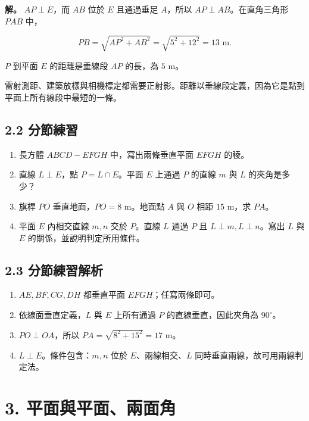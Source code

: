 \documentclass[11pt,a4paper]{article}
\providecommand{\tightlist}{%
  \setlength{\itemsep}{0pt}\setlength{\parskip}{0pt}}
\begin{document}
\textbf{解。} \(AP\perp E\)，而 \(AB\) 位於 \(E\) 且通過垂足 \(A\)，所以 \(AP\perp AB\)。在直角三角形 \(PAB\) 中，

\[
PB=\sqrt{AP^2+AB^2}=\sqrt{5^2+12^2}=13\text{ m}.
\]

\(P\) 到平面 \(E\) 的距離是垂線段 \(AP\) 的長，為 \(5\text{ m}\)。

雷射測距、建築放樣與相機標定都需要正射影。距離以垂線段定義，因為它是點到平面上所有線段中最短的一條。

\subsection{2.2 分節練習}\label{ux5206ux7bc0ux7df4ux7fd2-1}

\begin{enumerate}
\def\labelenumi{\arabic{enumi}.}
\tightlist
\item
  長方體 \(ABCD-EFGH\) 中，寫出兩條垂直平面 \(EFGH\) 的稜。
\item
  直線 \(L\perp E\)，點 \(P=L\cap E\)。平面 \(E\) 上通過 \(P\) 的直線 \(m\) 與 \(L\) 的夾角是多少？
\item
  旗桿 \(PO\) 垂直地面，\(PO=8\text{ m}\)。地面點 \(A\) 與 \(O\) 相距 \(15\text{ m}\)，求 \(PA\)。
\item
  平面 \(E\) 內相交直線 \(m,n\) 交於 \(P\)。直線 \(L\) 通過 \(P\) 且 \(L\perp m,L\perp n\)。寫出 \(L\) 與 \(E\) 的關係，並說明判定所用條件。
\end{enumerate}

\subsection{2.3 分節練習解析}\label{ux5206ux7bc0ux7df4ux7fd2ux89e3ux6790-1}

\begin{enumerate}
\def\labelenumi{\arabic{enumi}.}
\tightlist
\item
  \(AE,BF,CG,DH\) 都垂直平面 \(EFGH\)；任寫兩條即可。
\item
  依線面垂直定義，\(L\) 與 \(E\) 上所有通過 \(P\) 的直線垂直，因此夾角為 \(90^\circ\)。
\item
  \(PO\perp OA\)，所以 \(PA=\sqrt{8^2+15^2}=17\text{ m}\)。
\item
  \(L\perp E\)。條件包含：\(m,n\) 位於 \(E\)、兩線相交、\(L\) 同時垂直兩線，故可用兩線判定法。
\end{enumerate}

\section{3. 平面與平面、兩面角}\label{ux5e73ux9762ux8207ux5e73ux9762ux5169ux9762ux89d2}
\end{document}

